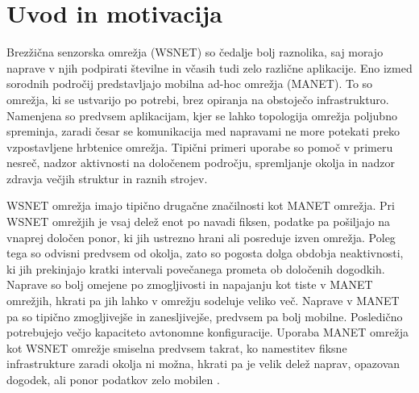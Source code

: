 
\section{Uvod in motivacija}
Brezžična senzorska omrežja (WSNET) so čedalje bolj raznolika, saj morajo naprave v njih podpirati številne in včasih tudi zelo različne aplikacije. Eno izmed sorodnih področij predstavljajo mobilna ad-hoc omrežja (MANET). To so omrežja, ki se ustvarijo po potrebi, brez opiranja na obstoječo infrastrukturo. Namenjena so predvsem aplikacijam, kjer se lahko topologija omrežja poljubno spreminja, zaradi česar se komunikacija med napravami ne more potekati preko vzpostavljene hrbtenice omrežja. Tipični primeri uporabe so pomoč v primeru nesreč, nadzor aktivnosti na določenem področju, spremljanje okolja in nadzor zdravja večjih struktur in raznih strojev.

WSNET omrežja imajo tipično drugačne značilnosti kot MANET omrežja. Pri WSNET omrežjih je vsaj delež enot po navadi fiksen, podatke pa pošiljajo na vnaprej določen ponor, ki jih ustrezno hrani ali posreduje izven omrežja. Poleg tega so odvisni predvsem od okolja, zato so pogosta dolga obdobja neaktivnosti, ki jih prekinjajo kratki intervali povečanega prometa ob določenih dogodkih. Naprave so bolj omejene po zmogljivosti in napajanju kot tiste v MANET omrežjih, hkrati pa jih lahko v omrežju sodeluje veliko več. Naprave v MANET pa so tipično zmogljivejše in zanesljivejše, predvsem pa bolj mobilne. Posledično potrebujejo večjo kapaciteto avtonomne konfiguracije. Uporaba MANET omrežja kot WSNET omrežje smiselna predvsem takrat, ko namestitev fiksne infrastrukture zaradi okolja ni možna, hkrati pa je velik delež naprav, opazovan dogodek, ali ponor podatkov zelo mobilen \cite{karl2007protocols}.

